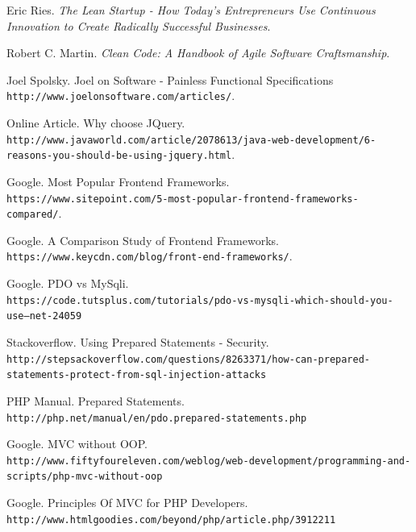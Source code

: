 \begin{thebibliography}{9}

Eric Ries. 
\textit{The Lean Startup - How Today's Entrepreneurs Use Continuous Innovation to Create Radically Successful Businesses}. 
 
Robert C. Martin.
\textit{Clean Code: A Handbook of Agile Software Craftsmanship}.

\bibitem{} 
Joel Spolsky. Joel on Software - Painless Functional Specifications
\\\texttt{http://www.joelonsoftware.com/articles/}.

\bibitem{} 
Online Article. Why choose JQuery.
\\{\footnotesize \texttt{http://www.javaworld.com/article/2078613/java-web-development/6-reasons-you-should-be-using-jquery.html}.}

\bibitem{} 
Google. Most Popular Frontend Frameworks.
\\\texttt{https://www.sitepoint.com/5-most-popular-frontend-frameworks-compared/}.

\bibitem{} 
Google. A Comparison Study of Frontend Frameworks.
\\\texttt{https://www.keycdn.com/blog/front-end-frameworks/}.

\bibitem{} 
Google. PDO vs MySqli.
\\\texttt{https://code.tutsplus.com/tutorials/pdo-vs-mysqli-which-should-you-use--net-24059}

\bibitem{} 
Stackoverflow. Using Prepared Statements - Security.
\\\texttt{http://stepsackoverflow.com/questions/8263371/how-can-prepared-statements-protect-from-sql-injection-attacks}

\bibitem{} 
PHP Manual. Prepared Statements.
\\\texttt{http://php.net/manual/en/pdo.prepared-statements.php}

\bibitem{} 
Google. MVC without OOP.
\\\texttt{http://www.fiftyfoureleven.com/weblog/web-development/programming-and-scripts/php-mvc-without-oop}


\bibitem{} 
Google. Principles Of MVC for PHP Developers.
\\\texttt{http://www.htmlgoodies.com/beyond/php/article.php/3912211}

\end{thebibliography}













 












